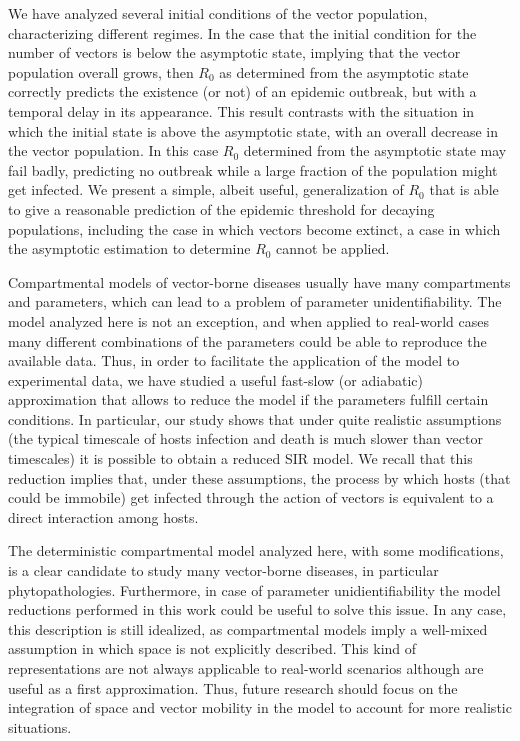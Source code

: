 We have analyzed several initial conditions of the vector population,
characterizing different regimes. In the case that the initial condition for
the number of vectors is below the asymptotic state, implying that the vector
population overall grows, then $R_0$ as determined from the asymptotic state
correctly predicts the existence (or not) of an epidemic outbreak, but with a
temporal delay in its appearance. This result contrasts with the situation in
which the initial state is above the asymptotic state, with an overall decrease
in the vector population. In this case $R_0$ determined from the asymptotic
state may fail badly, predicting no outbreak while a large fraction of the
population might get infected. We present a simple, albeit useful,
generalization of $R_0$ that is able to give a reasonable prediction of the
epidemic threshold for decaying populations, including the case in which
vectors become extinct, a case in which the asymptotic estimation to determine
$R_0$ cannot be applied.

Compartmental models of vector-borne diseases usually have many
compartments and parameters, which can lead to a problem of parameter
unidentifiability. The model analyzed here is not an exception, and when
applied to real-world cases many different combinations of the parameters could
be able to reproduce the available data. Thus, in order to facilitate the
application of the model to experimental data, we have studied a useful
fast-slow (or adiabatic) approximation that allows to reduce the model if the
parameters fulfill certain conditions. In particular, our study shows that
under quite realistic assumptions (the typical timescale of hosts infection and
death is much slower than vector timescales) it is possible to obtain a reduced
SIR model. We recall that this reduction implies that, under these assumptions,
the process by which hosts (that could be immobile) get infected through the
action of vectors is equivalent to a direct interaction among hosts.

The deterministic compartmental model analyzed here, with some
modifications, is a clear candidate to study many vector-borne diseases, in
particular phytopathologies. Furthermore, in case of parameter
unidientifiability the model reductions performed in this work could be useful
to solve this issue. In any case, this description is still idealized, as
compartmental models imply a well-mixed assumption in which space is not
explicitly described. This kind of representations are not always applicable to
real-world scenarios although are useful as a first approximation. Thus, future
research should focus on the integration of space and vector mobility in the
model to account for more realistic situations.

